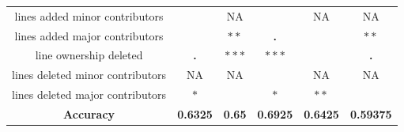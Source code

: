 \begin{table}[ht]
\begin{tabular}{|c|c|c|c|c|c|}
lines added minor contributors   & \textbf{}            & NA             & \textbf{}       & NA              & NA                 \\
lines added major contributors   & \textbf{}            & \textbf{$\ast\ast$}    & \textbf{.}      & \textbf{}       & \textbf{$\ast\ast$}        \\ \hline
line ownership deleted           & \textbf{.}           & \textbf{$\ast\ast\ast$}   & \textbf{$\ast\ast\ast$}    & \textbf{}       & \textbf{.}         \\
lines deleted minor contributors & NA                   & NA             &                 & NA              & NA                 \\
lines deleted major contributors & \textbf{$\ast$}           & \textbf{}      & \textbf{$\ast$}      & \textbf{$\ast\ast$}     & \textbf{}          \\ \hline
\textbf{Accuracy}                & \textbf{0.6325}      & \textbf{0.65}  & \textbf{0.6925} & \textbf{0.6425} & \textbf{0.59375}   \\ \hline
\end{tabular}
\end{table}



